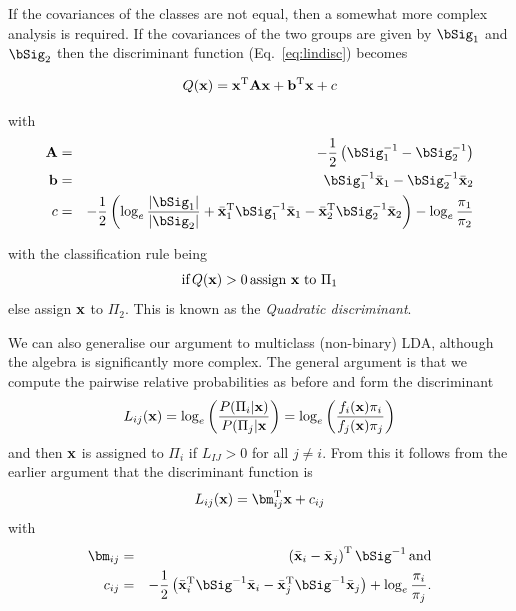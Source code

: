\documentclass[12pt,a4paper]{tufte-handout}
\begin{document}
If the covariances of the classes are not equal, then a somewhat more complex analysis is required. If the covariances of the two groups are given by $\bSig_1$ and $\bSig_2$ then the discriminant function (Eq.~\eqref{eq:lindisc}) becomes

\begin{equation}
  Q(\mathbf{x}) = \mathbf{x}^{\mathrm{T}}\mathbf{A}\mathbf{x} + \mathbf{b}^{\mathrm{T}}\mathbf{x} + c
\end{equation}

with
\begin{eqnarray}
  \bA &=& -\frac{1}{2}\left(\bSig_1^{-1}-\bSig_2^{-1}\right) \\
  \bb &=& \bSig^{-1}_1\bar\bx_1 - \bSig^{-1}_2\bar\bx_2 \\
  c &=& -\frac{1}{2}\left(\log_e\frac{\abs{\bSig_1}}{\abs{\bSig_2}}+\bar\bx_1^\rT\bSig_1^{-1}\bar\bx_1-\bar\bx_2^\rT\bSig_2^{-1}\bar\bx_2\right)-\log_e\frac{\pi_1}{\pi_2}
\end{eqnarray}

with the classification rule being
\begin{equation}
  \mbox{if}\,Q(\mathbf{x})>0\,\mbox{assign $\mathbf{x}$ to $\Pi_1$}
\end{equation}
else assign $\mathbf{x}$ to $\Pi_2$. This is known as the \textit{Quadratic discriminant}.

We can also generalise our argument to multiclass (non-binary) LDA, although the algebra is significantly more complex. The general argument is that we compute the pairwise relative probabilities as before and form the discriminant
\begin{equation}
  L_{ij}(\mathbf{x}) = \log_e\left(\frac{P(\Pi_i|\mathbf{x})}{P(\Pi_j|\mathbf{x}}\right)=\log_e\left(\frac{f_i(\mathbf{x})\pi_i}{f_j(\mathbf{x})\pi_j}\right)
\end{equation}
and then $\mathbf{x}$ is assigned to $\Pi_i$ if $L_{IJ}>0$ for all $j\neq i$. From this it follows from the earlier argument that the discriminant function is 
\begin{equation}
    L_{ij}(\bx) =\bm^\rT_{ij}\bx+c_{ij}
\end{equation}
with 
\begin{eqnarray}
  \bm_{ij} &=& \left(\bar\bx_i-\bar\bx_j\right)^\rT\bSig^{-1}\, \mbox{and}\\
  c_{ij}&=&-\frac{1}{2}\left(\bar\bx_i^\rT\bSig^{-1}\bar\bx_i - \bar\bx_j^\rT\bSig^{-1}\bar\bx_j\right)+\log_e\frac{\pi_i}{\pi_j}.
\end{eqnarray}
\end{document}
